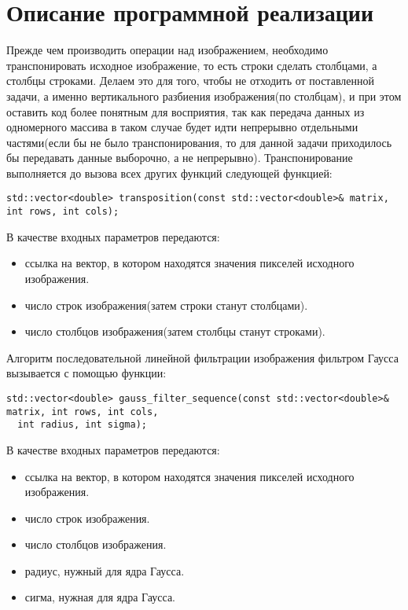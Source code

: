 \documentclass{report}
\begin{document}
\section*{Описание программной реализации}
Прежде чем производить операции над изображением, необходимо транспонировать исходное изображение, то есть строки сделать столбцами, а столбцы строками. Делаем это для того, чтобы не отходить от поставленной задачи, а именно вертикального разбиения изображения(по столбцам), и при этом оставить код более понятным для восприятия, так как передача данных из одномерного массива в таком случае будет идти непрерывно отдельными частями(если бы не было транспонирования, то для данной задачи приходилось бы передавать данные выборочно, а не непрерывно). Транспонирование выполняется до вызова всех других функций следующей функцией:
\begin{lstlisting}
std::vector<double> transposition(const std::vector<double>& matrix, int rows, int cols);
\end{lstlisting}
\par В качестве входных параметров передаются:
\begin{itemize}
\item ссылка на вектор, в котором находятся значения пикселей исходного изображения.
\item число строк изображения(затем строки станут столбцами).
\item число столбцов изображения(затем столбцы станут строками).
\end{itemize}
\par Алгоритм последовательной линейной фильтрации изображения фильтром Гаусса вызывается с помощью функции:
\begin{lstlisting}
std::vector<double> gauss_filter_sequence(const std::vector<double>& matrix, int rows, int cols,
  int radius, int sigma);
\end{lstlisting}
\par В качестве входных параметров передаются:
\begin{itemize}
\item ссылка на вектор, в котором находятся значения пикселей исходного изображения.
\item число строк изображения.
\item число столбцов изображения.
\item радиус, нужный для ядра Гаусса.
\item сигма, нужная для ядра Гаусса.
\end{itemize}
\end{document}

